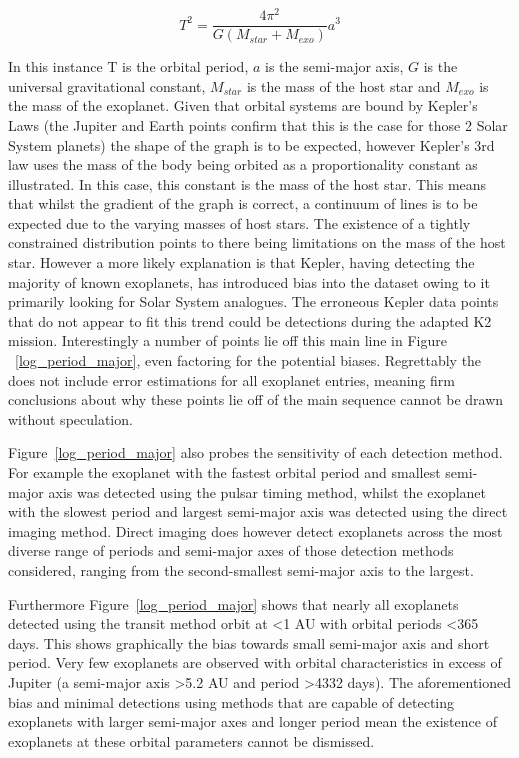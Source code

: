 \documentclass{report}
\begin{document}
\begin{equation} \label{Kepler}
    T^{2} = \frac{4\pi^2}{G(M_{star}+M_{exo})} a^{3} 
\end{equation}

In this instance T is the orbital period, $a$ is the semi-major axis, $G$ is the universal gravitational constant, $M_{star}$ is the mass of the host star and $M_{exo}$ is the mass of the exoplanet. Given that orbital systems are bound by Kepler's Laws (the Jupiter and Earth points confirm that this is the case for those 2 Solar System planets) the shape of the graph is to be expected, however Kepler's 3rd law uses the mass of the body being orbited as a proportionality constant as illustrated. In this case, this constant is the mass of the host star. This means that whilst the gradient of the graph is correct, a continuum of lines is to be expected due to the varying masses of host stars. The existence of a tightly constrained distribution points to there being limitations on the mass of the host star. However a more likely explanation is that Kepler, having detecting the majority of known exoplanets, has introduced bias into the dataset owing to it primarily looking for Solar System analogues. The erroneous Kepler data points that do not appear to fit this trend could be detections during the adapted K2 mission. Interestingly a number of points lie off this main line in Figure ~\ref{log_period_major}, even factoring for the potential biases. Regrettably the \textcite{exo} does not include error estimations for all exoplanet entries, meaning firm conclusions about why these points lie off of the main sequence cannot be drawn without speculation.

Figure~\ref{log_period_major} also probes the sensitivity of each detection method. For example the exoplanet with the fastest orbital period and smallest semi-major axis was detected using the pulsar timing method, whilst the exoplanet with the slowest period and largest semi-major axis was detected using the direct imaging method. Direct imaging does however detect exoplanets across the most diverse range of periods and semi-major axes of those detection methods considered, ranging from the second-smallest semi-major axis to the largest.

Furthermore Figure~\ref{log_period_major} shows that nearly all exoplanets detected using the transit method orbit at \textless 1 AU with orbital periods \textless 365 days. This shows graphically the bias towards small semi-major axis and short period. Very few exoplanets are observed with orbital characteristics in excess of Jupiter (a semi-major axis \textgreater 5.2 AU and period \textgreater 4332 days). The aforementioned bias and minimal detections using methods that are capable of detecting exoplanets with larger semi-major axes and longer period mean the existence of exoplanets at these orbital parameters cannot be dismissed.
\end{document}
